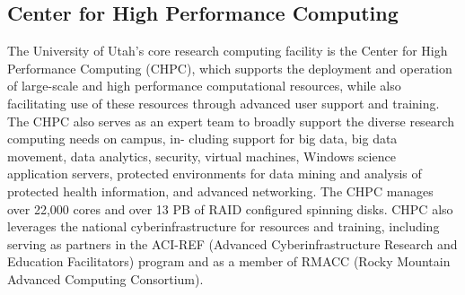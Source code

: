 \subsection*{Center for High Performance Computing}
The University of Utah’s core research computing facility is the Center for High Performance Computing (CHPC), which supports the deployment and operation of large-scale and high performance computational resources, while also facilitating use of these resources through advanced user support and training. The CHPC also serves as an expert team to broadly support the diverse research computing needs on campus, in- cluding support for big data, big data movement, data analytics, security, virtual machines, Windows science application servers, protected environments for data mining and analysis of protected health information, and advanced networking. The CHPC manages over 22,000 cores and over 13 PB of RAID configured spinning disks. CHPC also leverages the national cyberinfrastructure for resources and training, including serving as partners in the ACI-REF (Advanced Cyberinfrastructure Research and Education Facilitators) program and as a member of RMACC (Rocky Mountain Advanced Computing Consortium).

